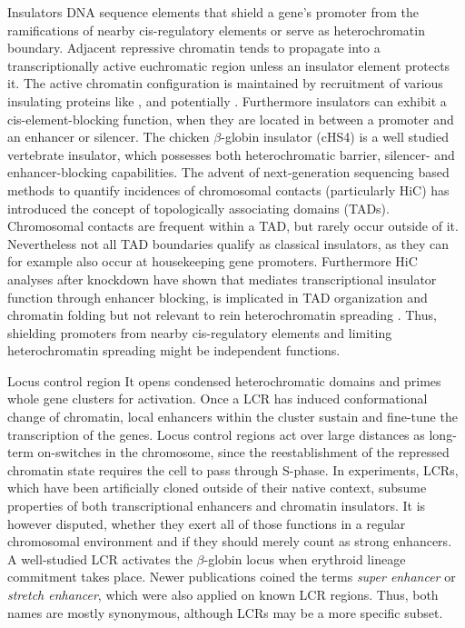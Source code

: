 \begin{mydescription}{0.5cm}
	\item[Insulators] DNA sequence elements that shield a gene's promoter from the ramifications of nearby cis-regulatory elements or serve as heterochromatin boundary. Adjacent repressive chromatin tends to propagate into a transcriptionally active euchromatic region unless an insulator element protects it\cite{Donze2002}. The active chromatin configuration is maintained by recruitment of various insulating proteins like ,  and potentially \cite{Gaszner2006,Barkess2012,Ong2014}. Furthermore insulators can exhibit a cis-element-blocking function, when they are located in between a promoter and an enhancer or silencer. The chicken \ensuremath{\beta}-globin insulator (cHS4) is a well studied vertebrate insulator, which possesses both heterochromatic barrier, silencer- and enhancer-blocking capabilities\cite{Walters1999,Yao2003,Rincon-Arano2007}. The advent of next-generation sequencing based methods to quantify incidences of chromosomal contacts (particularly HiC\cite{Lieberman-Aiden2009}) has introduced the concept of topologically associating domains (TADs)\cite{Dixon2012,Jost2014}. Chromosomal contacts are frequent within a TAD, but rarely occur outside of it. Nevertheless not all TAD boundaries qualify as classical insulators, as they can for example also occur at housekeeping gene promoters\cite{Hug2017,Flyamer2017}. Furthermore HiC analyses after  knockdown have shown that  mediates transcriptional insulator function through enhancer blocking, is implicated in TAD organization and chromatin folding but not relevant to rein heterochromatin spreading \cite{Nora2017}. Thus, shielding promoters from nearby cis-regulatory elements and limiting heterochromatin spreading might be independent functions. 
	
	\item [Locus control region] It opens condensed heterochromatic domains and primes whole gene clusters for activation. Once a LCR has induced conformational change of chromatin, local enhancers within the cluster sustain and fine-tune the transcription of the genes.
	Locus control regions act over large distances as long-term on-switches in the chromosome, since the reestablishment of the repressed chromatin state requires the cell to pass through S-phase\cite{Li2002}. In experiments, LCRs, which have been artificially cloned outside of their native context, subsume properties of both transcriptional enhancers and chromatin insulators. It is however disputed, whether they exert all of those functions in a regular chromosomal environment and if they should merely count as strong enhancers\cite{Bulger2013}. A well-studied LCR activates the \ensuremath{\beta}-globin locus when erythroid lineage commitment takes place\cite{Forrester1990,Jimenez1992,Allahyar2018}. Newer publications coined the terms \emph{super enhancer}\cite{Hnisz2013} or \emph{stretch enhancer}, which were also applied on known LCR regions. Thus, both names are mostly synonymous, although LCRs may be a more specific subset. 
	

\end{mydescription}

